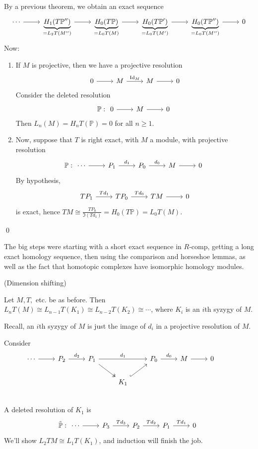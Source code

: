 \documentclass[x11names,reqno,14pt]{extarticle}
\renewcommand{\P}{\mathbb{P}}
\begin{document}
By a previous theorem, we obtain an exact sequence 
\[
\begin{tikzcd}
\cdots\ar[r]& \underbrace{H_1(T\P'')}_{=L_2T(M'')}\ar[r]&\underbrace{H_0(T\P)}_{=L_0T(M)} \ar[r] & \underbrace{H_0(T\P')}_{=L_0T(M')} \ar[r] & \underbrace{H_0(T\P'')}_{=L_0T(M'')} \ar[r]& 0 
\end{tikzcd}
\]
Now:

\begin{enumerate}[label=(\alph*)]

\item If $M$ is projective, then we have a projective resolution 
\[
\begin{tikzcd}
0\ar[r]&M\ar[r, "\Id_M"] & M \ar[r]& 0 
\end{tikzcd}
\]
Consider the deleted resolution 
\[
\P:\begin{tikzcd} 0 \ar[r]& M \ar[r] & 0 \end{tikzcd}
\]
Then $L_n(M) = H_nT(\P) = 0$ for all $n \geq 1$. 

\item Now, suppose that $T$ is right exact, with $M$ a module, with projective resolution
\[
\P:
\begin{tikzcd}
\cdots\ar[r] & P_1 \ar[r, "d_1"] & P_0 \ar[r, "d_0"] & M \ar[r] & 0 
\end{tikzcd}
\]
By hypothesis, 
\[
\begin{tikzcd}
TP_1\ar[r, "Td_1"] & TP_0\ar[r, "Td_0"] & TM \ar[r] & 0 
\end{tikzcd}
\]
is exact, hence $TM \cong \frac{TP_0}{\Im(Td_1)} = H_0(T\P) = L_0T(M)$. 

\end{enumerate}

\qed

The big steps were starting with a short exact sequence in $R$-comp, getting a long exact homology sequence, then using the comparison and horseshoe lemmas, as well as the fact that homotopic complexes have isomorphic homology modules. 

\thm (Dimension shifting) 

Let $M, T, $ etc. be as before. Then $L_nT(M) \cong L_{n - 1}T(K_1) \cong L_{n - 2}T(K_2) \cong \cdots$, where $K_i$ is an $i$th syzygy of $M$. 

\proof

Recall, an $i$th syzygy of $M$ is just the image of $d_i$ in a projective resolution of $M$. 

Consider
\[
\begin{tikzcd}
\cdots\ar[r] & P_2\ar[r, "d_2" ] & P_1\ar[rr, "d_1"]\ar[dr, twoheadrightarrow]& & P_0 \ar[r, "d_0"] & M \ar[r] & 0 \\
& &  &K_1\ar[ur, hook]  & & & & \\
\end{tikzcd}
\]
A deleted resolution of $K_1$ is 
\[\tilde{\P}:
\begin{tikzcd}
\cdots\ar[r] & P_3 \ar[r,"Td_3"] & P_2 \ar[r,"Td_2"] & P_1 \ar[r,"Td_1"] & 0 
\end{tikzcd}
\]
We'll show $L_2TM \cong L_1T(K_1)$, and induction will finish the job. 
\end{document}
